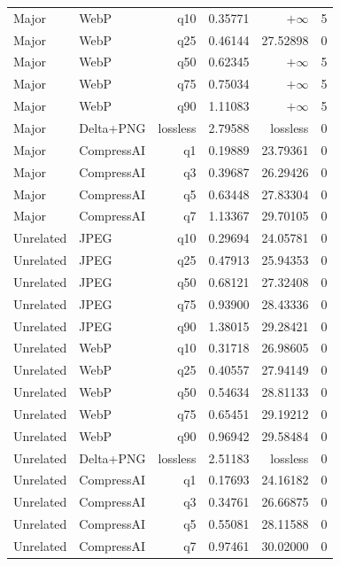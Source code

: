 \begin{longtable}{llrrrr}
Major & WebP & q10 & 0.35771 & $+\infty$ & 5\\
Major & WebP & q25 & 0.46144 & 27.52898 & 0\\
Major & WebP & q50 & 0.62345 & $+\infty$ & 5\\
Major & WebP & q75 & 0.75034 & $+\infty$ & 5\\
Major & WebP & q90 & 1.11083 & $+\infty$ & 5\\
Major & Delta+PNG & lossless & 2.79588 & lossless & 0\\
Major & CompressAI & q1 & 0.19889 & 23.79361 & 0\\
Major & CompressAI & q3 & 0.39687 & 26.29426 & 0\\
Major & CompressAI & q5 & 0.63448 & 27.83304 & 0\\
Major & CompressAI & q7 & 1.13367 & 29.70105 & 0\\
Unrelated & JPEG & q10 & 0.29694 & 24.05781 & 0\\
Unrelated & JPEG & q25 & 0.47913 & 25.94353 & 0\\
Unrelated & JPEG & q50 & 0.68121 & 27.32408 & 0\\
Unrelated & JPEG & q75 & 0.93900 & 28.43336 & 0\\
Unrelated & JPEG & q90 & 1.38015 & 29.28421 & 0\\
Unrelated & WebP & q10 & 0.31718 & 26.98605 & 0\\
Unrelated & WebP & q25 & 0.40557 & 27.94149 & 0\\
Unrelated & WebP & q50 & 0.54634 & 28.81133 & 0\\
Unrelated & WebP & q75 & 0.65451 & 29.19212 & 0\\
Unrelated & WebP & q90 & 0.96942 & 29.58484 & 0\\
Unrelated & Delta+PNG & lossless & 2.51183 & lossless & 0\\
Unrelated & CompressAI & q1 & 0.17693 & 24.16182 & 0\\
Unrelated & CompressAI & q3 & 0.34761 & 26.66875 & 0\\
Unrelated & CompressAI & q5 & 0.55081 & 28.11588 & 0\\
Unrelated & CompressAI & q7 & 0.97461 & 30.02000 & 0\\
\end{longtable}
